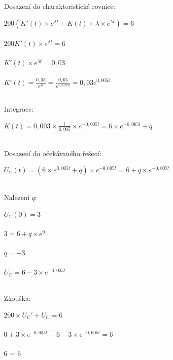 \documentclass[12pt,a4paper,titlepage,final]{article}
\begin{document}
	Dosazení do charakteristické rovnice:
	
	\begin{tabbing}
		$ 200 (K' (t) \times e^{ \lambda t } + 
		  K (t) \times \lambda \times e^{ \lambda t} ) = 6 $ \\
		\\
		$ 200 K' (t) \times e^{ \lambda t} = 6 $ \\
		\\
		$ K' (t) \times e^{ \lambda t } = 0,03 $ \\
		\\
		$ { \displaystyle K' (t) = 
		\frac{0,03}{e^{ \lambda t }} = 
		\frac{0,03}{e^{-0.005t}} = 0,03e^{0,005t} }$ \\
		\\
	\end{tabbing}

	Integrace:
	
	\begin{tabbing}
		$ K (t) = 0,003 \times 
		\frac{1}{0,005} \times e^{-0,005t} = 6 \times e^{-0,005t} + q$ \\
		\\
	\end{tabbing}
	
	Dosazení do očekávaného řešení:
	
	\begin{tabbing}
		$ U_{C}(t) = (6 \times e^{0,005t} + q) \times e^{-0,005t} =
		6 + q \times e^{-0,005t}$ \\
		\\
	\end{tabbing}
	
	Nalezení $q$:
	
	\begin{tabbing}
		$ U_{C} (0) = 3 $ \\
		\\
		$ 3 = 6 + q \times e^{0} $ \\
		\\
		$ q = -3 $ \\
		\\
		$ U_{C} = 6 - 3 \times e^{-0,005t} $ \\
		\\ 
	\end{tabbing}
	
	Zkouška:
	
	\begin{tabbing}
		$ 200 \times U_{C}' + U_{C} = 6 $ \\
		\\
		$ 0 + 3 \times e^{-0,005t} + 6 -3 \times e^{-0,005t} = 6 $ \\
		\\
		6 = 6 \\
		\\		
	\end{tabbing}
	
	\newpage

\end{document}
